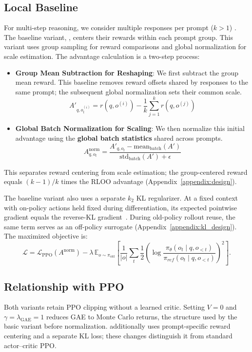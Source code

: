 \subsection{Local Baseline}
For multi-step reasoning, we consider multiple responses per prompt ($k > 1$) \citep{yue2025vapo}. The baseline variant, \varn, centers their rewards within each prompt group. This variant uses group sampling for reward comparisons and global normalization for scale estimation. The advantage calculation is a two-step process:
\begin{itemize}
    \item \textbf{Group Mean Subtraction for Reshaping}: We first subtract the group mean reward. This baseline removes reward offsets shared by responses to the same prompt; the subsequent global normalization sets their common scale.
    \begin{equation}\label{eq:group_center}
     A'_{q,o_t^{(i)}} = r(q,o^{(i)}) - \frac{1}{k}\sum_{j=1}^k r(q,o^{(j)})
    \end{equation}
    \item \textbf{Global Batch Normalization for Scaling}: We then normalize this initial advantage using the \textbf{global batch statistics} shared across prompts.
    \begin{equation}
     A_{q,o_t}^{\text{norm}} = \frac{A'_{q,o_t} - \mathrm{mean}_{\text{batch}}(A')}{\text{std}_{\text{batch}}(A') + \epsilon}
    \end{equation}
\end{itemize}
This separates reward centering from scale estimation; the group-centered reward equals $(k-1)/k$ times the RLOO advantage (Appendix~\ref{appendix:design}).

The baseline variant also uses a separate $k_2$ KL regularizer. At a fixed context with on-policy actions held fixed during differentiation, its expected pointwise gradient equals the reverse-KL gradient~\citep{liu2025rethinking}. During old-policy rollout reuse, the same term serves as an off-policy surrogate (Appendix~\ref{appendix:kl_design}). The maximized objective is:
\begin{equation}\label{eq:baseline_loss}
\mathcal{L} = \mathcal{L}_{\text{PPO}}(A^{\text{norm}}) - \lambda\,\mathbb{E}_{o\sim\pi_{\mathrm{old}}}\left[\frac{1}{|o|}\sum_t \frac12\left(\log\frac{\pi_\theta(o_t\mid q,o_{<t})}{\pi_{ref}(o_t\mid q,o_{<t})}\right)^2\right].
\end{equation}

\subsection{Relationship with PPO}
Both variants retain PPO clipping without a learned critic. Setting $V=0$ and $\gamma=\lambda_{\mathrm{GAE}}=1$ reduces GAE to Monte Carlo returns, the structure used by the basic variant before normalization. \varn additionally uses prompt-specific reward centering and a separate KL loss; these changes distinguish it from standard actor--critic PPO.

